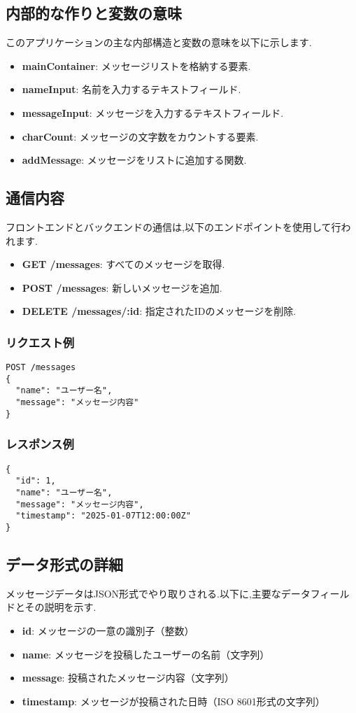 \documentclass[uplatex,dvipdfmx]{jsarticle}
\begin{document}
\subsection{内部的な作りと変数の意味}
このアプリケーションの主な内部構造と変数の意味を以下に示します.
\begin{itemize}
    \item \textbf{mainContainer}: メッセージリストを格納する要素.
    \item \textbf{nameInput}: 名前を入力するテキストフィールド.
    \item \textbf{messageInput}: メッセージを入力するテキストフィールド.
    \item \textbf{charCount}: メッセージの文字数をカウントする要素.
    \item \textbf{addMessage}: メッセージをリストに追加する関数.
\end{itemize}

\subsection{通信内容}
フロントエンドとバックエンドの通信は,以下のエンドポイントを使用して行われます.
\begin{itemize}
    \item \textbf{GET /messages}: すべてのメッセージを取得.
    \item \textbf{POST /messages}: 新しいメッセージを追加.
    \item \textbf{DELETE /messages/:id}: 指定されたIDのメッセージを削除.
\end{itemize}

\subsubsection{リクエスト例}
\begin{verbatim}
POST /messages
{
  "name": "ユーザー名",
  "message": "メッセージ内容"
}
\end{verbatim}

\subsubsection{レスポンス例}
\begin{verbatim}
{
  "id": 1,
  "name": "ユーザー名",
  "message": "メッセージ内容",
  "timestamp": "2025-01-07T12:00:00Z"
}
\end{verbatim}

\subsection{データ形式の詳細}
メッセージデータはJSON形式でやり取りされる.以下に,主要なデータフィールドとその説明を示す.
\begin{itemize}
    \item \textbf{id}: メッセージの一意の識別子（整数）
    \item \textbf{name}: メッセージを投稿したユーザーの名前（文字列）
    \item \textbf{message}: 投稿されたメッセージ内容（文字列）
    \item \textbf{timestamp}: メッセージが投稿された日時（ISO 8601形式の文字列）
\end{itemize}
\end{document}
